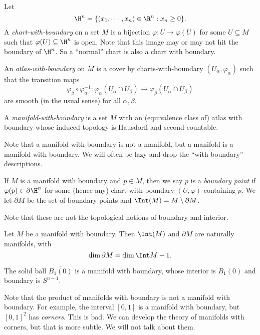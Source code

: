 \documentclass[a4paper]{article}
\begin{document}
\begin{defi}
  Let
  \[
    \H^n = \{(x_1, \cdots, x_n)\in \R^n: x_n \geq 0\}.
  \]
  A \emph{chart-with-boundary} on a set $M$ is a bijection $\varphi: U \to \varphi(U)$ for some $U \subseteq M$ such that $\varphi(U) \subseteq \H^n$ is open. Note that this image may or may not hit the boundary of $\H^n$. So a ``normal'' chart is also a chart with boundary.

  An \emph{atlas-with-boundary} on $M$ is a cover by charts-with-boundary $(U_\alpha, \varphi_\alpha)$ such that the transition maps
  \[
    \varphi_\beta \circ \varphi_\alpha^{-1}: \varphi_\alpha(U_\alpha \cap U_\beta) \to \varphi_\beta(U_\alpha \cap U_\beta)
  \]
  are smooth (in the usual sense) for all $\alpha, \beta$.

  A \emph{manifold-with-boundary} is a set $M$ with an (equivalence class of) atlas with boundary whose induced topology is Hausdorff and second-countable.
\end{defi}

Note that a manifold with boundary is not a manifold, but a manifold is a manifold with boundary. We will often be lazy and drop the ``with boundary'' descriptions.

\begin{defi}
  If $M$ is a manifold with boundary and $p \in M$, then we say $p$ is a \emph{boundary point} if $\varphi(p) \in \partial \H^n$ for some (hence any) chart-with-boundary $(U, \varphi)$ containing $p$. We let $\partial M$ be the set of boundary points and $\Int(M) = M \setminus \partial M$.
\end{defi}

Note that these are not the topological notions of boundary and interior.

\begin{prop}
  Let $M$ be a manifold with boundary. Then $\Int(M)$ and $\partial M$ are naturally manifolds, with
  \[
    \dim \partial M = \dim \Int M - 1.
  \]
\end{prop}

\begin{eg}
  The solid ball $\overline{B_1(0)}$ is a manifold with boundary, whose interior is $B_1(0)$ and boundary is $S^{n - 1}$.
\end{eg}

Note that the product of manifolds with boundary is not a manifold with boundary. For example, the interval $[0, 1]$ is a manifold with boundary, but $[0, 1]^2$ has \emph{corners}. This is bad. We can develop the theory of manifolds with corners, but that is more subtle. We will not talk about them.
\end{document}
